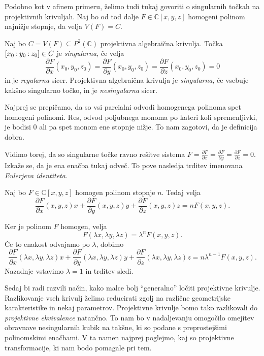 \documentclass[mat1]{fmfdelo}
\numberwithin{equation}{section}
\newcommand{\C}{\mathbb C}
\newcommand{\PC}{P^2(\mathbb C)}
\newcommand{\Cxyz}{\C[x,y,z]}
\newcommand{\pcoor}[1]{%
\begingroup\lccode`~=`: \lowercase{\endgroup
\edef~}{\mathbin{\mathchar\the\mathcode`:}\nobreak}%
\left[%
\begingroup
\mathcode`:=\string"8000
#1%
\endgroup
\right]%
}
\newcommand{\pdv}[2][]{\frac{\partial#1}{\partial#2}}
\theoremstyle{definition}
\begin{document}
Podobno kot v afinem primeru, želimo tudi tukaj govoriti o singularnih točkah na projektivnih krivuljah. Naj bo od tod dalje $F \in \C[x,y,z]$ homogeni polinom najnižje stopnje, da velja $V(F) = C$.

\begin{definicija}
    Naj bo $C = V(F) \subseteq \PC$ projektivna algebraična krivulja. Točka $\pcoor{x_0:y_0:z_0} \in C$ je \emph{singularna}, če velja
    \[
        \pdv[F]{x}(x_0, y_0, z_0) = \pdv[F]{y}(x_0, y_0, z_0) = \pdv[F]{z}(x_0, y_0, z_0) = 0
    \]
    in je \emph{regularna} sicer. Projektivna algebraična krivulja je \emph{singularna}, če vsebuje kakšno singularno točko, in je \emph{nesingularna} sicer.
\end{definicija}

Najprej se prepičamo, da so vsi parcialni odvodi homogenega polinoma spet homogeni polinomi. Res, odvod poljubnega monoma po kateri koli spremenljivki, je bodisi $0$ ali pa spet monom ene stopnje nižje. To nam zagotovi, da je definicija dobra.

Vidimo torej, da so singularne točke ravno rešitve sistema $F = \pdv[F]{x}= \pdv[F]{y} = \pdv[F]{z} = 0$.
Izkaže se, da je ena enačba tukaj odveč. To pove nasledja trditev imenovana \emph{Eulerjeva identiteta}.

\begin{trditev}
    Naj bo $F \in \Cxyz$ homogen polinom stopnje $n$. Tedaj velja
    \[
        \pdv[F]{x}(x,y,z)x + \pdv[F]{y}(x,y,z)y + \pdv[F]{z}(x,y,z)z = nF(x,y,z). 
    \]
\end{trditev}

\begin{dokaz}
    Ker je polinom $F$ homogen, velja 
    $$ F(\lambda x, \lambda y, \lambda z) = \lambda^n F(x,y,z).$$
    Če to enakost odvajamo po $\lambda$, dobimo
    $$ \pdv[F]{x}(\lambda x,\lambda y,\lambda z)x + 
    \pdv[F]{y}(\lambda x,\lambda y,\lambda z) y + 
    \pdv[F]{z}(\lambda x,\lambda y,\lambda z) z = n\lambda^{n-1}F(x,y,z).$$
    Nazadnje vstavimo $\lambda = 1$ in trditev sledi.
\end{dokaz}

Sedaj bi radi razvili način, kako malce bolj ``generalno'' ločiti projektivne krivulje. Razlikovanje vseh krivulj želimo reducirati zgolj na različne geometrijske karakteristike in nekaj parametrov. 
Projektivne krivulje bomo tako razlikovali do \emph{projektivne ekvivalence} natančno. 
To nam bo v nadaljevanju omogočilo omejitev obravnave nesingularnih kubik na takšne, ki so podane s preprostejšimi polinomskimi enačbami.
V ta namen najprej poglejmo, kaj so projektivne transformacije, ki nam bodo pomagale pri tem.
\end{document}
